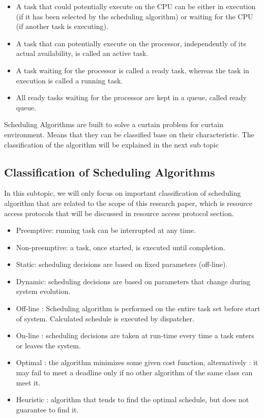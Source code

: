 \begin{itemize}
\item A task that could potentially execute on the CPU can be either in execution (if it has been selected by the scheduling algorithm) or waiting for the CPU (if another task is executing)\cite{b5}.

\item A task that can potentially execute on the processor, independently of its actual availability, is called an active task\cite{b5}.

\item A task waiting for the processor is called a ready task, whereas the task in execution is called a running task\cite{b5}.

\item All ready tasks waiting for the processor are kept in a queue, called ready queue\cite{b5}.

\end{itemize}

Scheduling Algorithms are built to solve a curtain problem for curtain environment. Means that they can be classified base on their characteristic. The classification of the algorithm will be explained in the next sub topic

\subsection{Classification of Scheduling Algorithms}

In this subtopic, we will only focus on important classification of scheduling algorithm that are related to the scope of this research paper, which is resource access protocols that will be discussed in resource access protocol section. 

\begin{itemize}
\item Preemptive: running task can be interrupted at any time\cite{b5}.
\item Non-preemptive: a task, once started, is executed until completion\cite{b5}.
\item Static: scheduling decisions are based on fixed parameters (off-line)\cite{b5}.
\item Dynamic: scheduling decisions are based on parameters that change during system evolution\cite{b5}.
\item Off-line : Scheduling algorithm is performed on the entire task set before start of system. Calculated schedule is executed by dispatcher\cite{b5}. 
\item On-line : scheduling decisions are taken at run-time every time a task enters or leaves the system\cite{b5}.
\item Optimal : the algorithm minimizes some given cost function, alternatively : it may fail to meet a deadline only if no other algorithm of the same class can meet it\cite{b5}.
\item Heuristic : algorithm that tends to find the optimal schedule, but does not guarantee to find it\cite{b5}.
\end{itemize}

